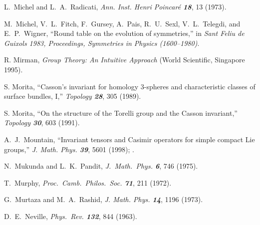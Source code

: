 L.~Michel and L.~A.~Radicati,
{\em Ann. Inst. Henri Poincar{\'e}  \bf 18}, 13 (1973).

M.~Michel, V.~L.~Fitch, F.~Gursey, A.~Pais, R.~U.~Sexl, V.~L.~Telegdi,
and E.~P.~Wigner,
``Round table on the evolution of symmetries,''
in {\em Sant Feliu de Guixols 1983, Proceedings, Symmetries in Physics %
(1600--1980)}.

 R. Mirman,
    {\em Group Theory: An Intuitive Approach}
    (World Scientific, Singapore 1995).




 S. Morita,
``Casson's invariant for homology
$3$-spheres and characteristic classes of surface bundles, {I},''
    {\em Topology  \bf 28}, 305 (1989).  %

 S. Morita,
``On the structure of the Torelli group and the Casson invariant,''
    {\em Topology  \bf 30}, 603 (1991). %

%
 A.~J.~Mountain,
``Invariant tensors and Casimir operators for simple compact Lie groups,''
{\em J. Math. Phys. \bf 39}, 5601 (1998);
.


N.~Mukunda and L.~K.~Pandit,
{\em J.~Math.~Phys.  \bf 6}, 746 (1975).

T.~Murphy,
{\em Proc.~Camb.~Philos.~Soc. \bf 71}, 211 (1972).

 G.~Murtaza and M.~A.~Rashid,
{\em J. Math. Phys. \bf 14}, 1196 (1973).



D.~E.~Neville,
{\em Phys.~Rev.  \bf 132}, 844 (1963).

